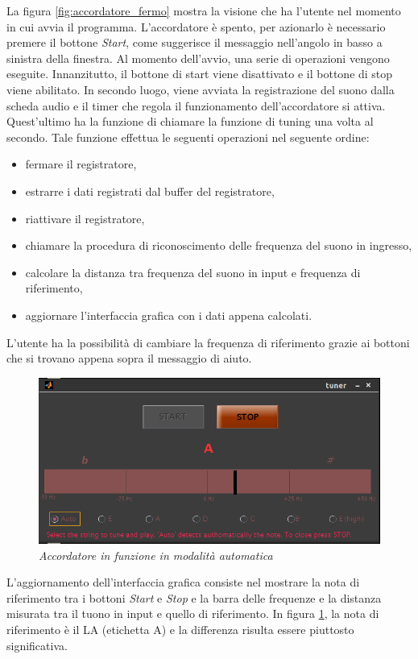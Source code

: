 La figura \ref{fig:accordatore_fermo} mostra la visione che ha l'utente nel momento in cui avvia il programma.
L'accordatore è spento, per azionarlo è necessario premere il bottone \emph{Start}, come suggerisce il messaggio nell'angolo in basso a sinistra della finestra.
Al momento dell'avvio, una serie di operazioni vengono eseguite.
Innanzitutto, il bottone di start viene disattivato e il bottone di stop viene abilitato.
In secondo luogo, viene avviata la registrazione del suono dalla scheda audio e il timer che regola il funzionamento dell'accordatore si attiva.
Quest'ultimo ha la funzione di chiamare la funzione di tuning una volta al secondo. 
Tale funzione effettua le seguenti operazioni nel seguente ordine:
\begin{itemize}
	\item fermare il registratore,
	\item estrarre i dati registrati dal buffer del registratore,
	\item riattivare il registratore,
	\item chiamare la procedura di riconoscimento delle frequenza del suono in ingresso,
	\item calcolare la distanza tra frequenza del suono in input e frequenza di riferimento,
	\item aggiornare l'interfaccia grafica con i dati appena calcolati.
\end{itemize}

L'utente ha la possibilità di cambiare la frequenza di riferimento grazie ai bottoni che si trovano appena sopra il messaggio di aiuto.

	\begin{figure}[h]
	  \begin{center} 
	    \includegraphics[width=\textwidth*\real{0.8}]{images/ch_07/accordatore_auto.png}
	  \end{center} 
	  \caption{\textit{Accordatore in funzione in modalità automatica}}  
	  \label{fig:accordatore_in_funzione}
	\end{figure}

L'aggiornamento dell'interfaccia grafica consiste nel mostrare la nota di riferimento tra i bottoni \emph{Start} e \emph{Stop} e la barra delle frequenze e la distanza misurata tra il tuono in input e quello di riferimento. 
In figura \ref{fig:accordatore_in_funzione}, la nota di riferimento è il LA (etichetta A) e la differenza risulta essere piuttosto significativa.



